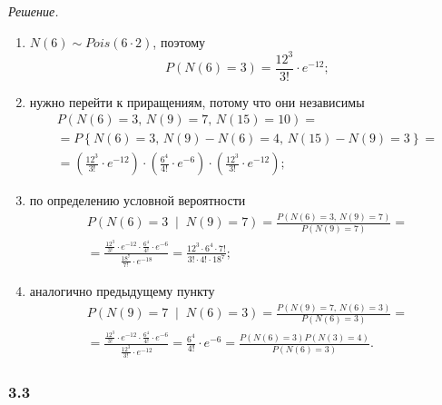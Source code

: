\textit{Решение.}
\begin{enumerate}[label=\alph*)]
  \item $N \left( 6 \right) \sim Pois \left( 6 \cdot 2 \right) $, поэтому
  $$P \left( N \left( 6 \right) = 3 \right) =
    \frac{12^3}{3!} \cdot e^{-12};$$
  \item нужно перейти к приращениям, потому что они независимы
  \begin{gather*}
    P \left(
      N \left( 6 \right) = 3, \, N \left(9 \right) = 7, \, N \left( 15 \right) = 10 \right) = \\
    = P \left\{
      N \left( 6 \right) = 3, \, N \left( 9 \right) - N \left( 6 \right) = 4, \,
      N \left( 15 \right) - N \left( 9 \right) = 3 \right\} = \\
    = \left( \frac{12^3}{3!} \cdot e^{-12} \right) \cdot
    \left( \frac{6^4}{4!} \cdot e^{-6} \right) \cdot \left( \frac{12^3}{3!} \cdot e^{-12} \right);
  \end{gather*}
  \item по определению условной вероятности
  \begin{gather*}
    P \left( N \left( 6 \right) = 3 \; \middle| \; N \left( 9 \right) = 7 \right) =
    \frac{P \left( N \left( 6 \right) = 3, \, N \left( 9 \right) = 7 \right) }{P \left( N \left( 9 \right) = 7 \right) } = \\
    = \frac{ \frac{12^3}{3!} \cdot e^{-12} \cdot \frac{6^4}{4!} \cdot e^{-6}}{ \frac{18^7}{7!} \cdot e^{-18}} =
    \frac{12^3 \cdot 6^4 \cdot 7!}{3! \cdot 4! \cdot 18^7};
  \end{gather*}
  \item аналогично предыдущему пункту
  \begin{gather*}
    P \left( N \left( 9 \right) = 7 \; \middle| \; N \left( 6 \right) = 3 \right) =
    \frac{P \left( N \left( 9 \right) = 7, \, N \left( 6 \right) = 3 \right) }{P \left( N \left(6 \right) = 3 \right) } = \\
    = \frac{ \frac{12^3}{3!} \cdot e^{-12} \cdot \frac{6^4}{4!} \cdot e^{-6}}{ \frac{12^3}{3!} \cdot e^{-12}} =
    \frac{6^4}{4!} \cdot e^{-6} =
    \frac{P \left( N \left( 6 \right) = 3 \right) P \left( N \left( 3 \right) = 4 \right) }{P \left( N \left( 6 \right) = 3 \right) }.
  \end{gather*}
\end{enumerate}

\subsubsection*{3.3}

